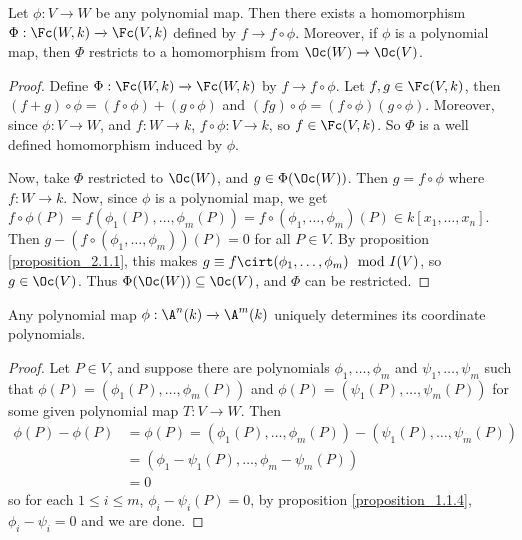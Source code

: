 \begin{proposition}\label{proposition_2.1.4}
  Let $\phi:V \xrightarrow{} W$ be any polynomial map. Then there exists a
  homomorphism $\Phi:\Fc(W,k) \xrightarrow{} \Fc(V,k)$ defined by $f
  \xrightarrow{} f \circ \phi$. Moreover, if $\phi$ is a polynomial map, then
  $\Phi$ restricts to a homomorphism from  $\Oc(W) \xrightarrow{} \Oc(V)$.
\end{proposition}
\begin{proof}
  Define $\Phi:\Fc(W,k) \xrightarrow{} \Fc(W,k)$ by $f \xrightarrow{} f \circ
  \phi$. Let $f,g \in \Fc(V,k)$, then $(f+g) \circ \phi=(f \circ \phi)+(g \circ
  \phi)$ and $(fg) \circ \phi=(f \circ \phi)(g \circ \phi)$. Moreover, since
  $\phi:V \xrightarrow{} W$, and $f:W \xrightarrow{} k$, $f \circ \phi: V
  \xrightarrow{} k$, so $f \in \Fc(V,k)$. So $\Phi$ is a well defined
  homomorphism induced by $\phi$.

  Now, take $\Phi$ restricted to $\Oc(W)$, and $g \in \Phi(\Oc(W))$. Then $g=f
  \circ \phi$ where $f:W \xrightarrow{} k$. Now, since $\phi$ is a polynomial
  map, we get $f \circ \phi(P)=f(\phi_1(P), \dots, \phi_m(P))=f \circ (\phi_1, \dots,
  \phi_m)(P) \in k[x_1, \dots, x_n]$. Then $g-(f \circ (\phi_1, \dots, \phi_m))(P)=0$ for
  all $P \in V$. By proposition \ref{proposition_2.1.1}, this makes $g \equiv f \cirt (\phi_1,
  \dots, \phi_m) \mod{I(V)}$, so $g \in \Oc(V)$. Thus $\Phi(\Oc(W)) \subseteq
  \Oc(V)$, and $\Phi$ can be restricted.
\end{proof}

\begin{proposition}\label{proposition_2.1.5}
  Any polynomial map $\phi:\A^n(k) \xrightarrow{} \A^m(k)$ uniquely determines its
  coordinate polynomials.
\end{proposition}
\begin{proof}
  Let $P \in V$, and suppose there are polynomials $\phi_1, \dots, \phi_m$ and $\psi_1,
  \dots, \psi_m$ such that $\phi(P)=(\phi_1(P), \dots, \phi_m(P))$ and
  $\phi(P)=(\psi_1(P), \dots, \psi_m(P))$ for some given polynomial map
  $T:V \xrightarrow{} W$. Then
  \begin{align*}
    \phi(P)-\phi(P) &= \phi(P)=(\phi_1(P), \dots, \phi_m(P))-(\psi_1(P), \dots, \psi_m(P)) \\
        &=  (\phi_1-\psi_1(P), \dots, \phi_m-\psi_m(P))  \\
        &=  0
  \end{align*}
  so for each $1 \leq i \leq m$, $\phi_i-\psi_i(P)=0$, by proposition \ref{proposition_1.1.4},
  $\phi_i-\psi_i=0$ and we are done.
\end{proof}

